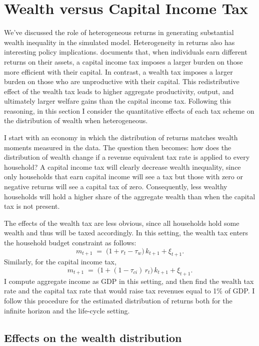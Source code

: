 \onlyinsubfile{\setcounter{section}{4}}
\section{Wealth versus Capital Income Tax}
\notinsubfile{\label{sec:Tax}}

\par We've discussed the role of heterogeneous returns in generating substantial wealth inequality in the simulated model. Heterogeneity in returns also has interesting policy implications.  \cite{Guvenen2023} documents that, when individuals earn different returns on their assets, a capital income tax imposes a larger burden on those more efficient with their capital. In contrast, a wealth tax imposes a larger burden on those who are unproductive with their capital. This redistributive effect of the wealth tax leads to higher aggregate productivity, output, and ultimately larger welfare gains than the capital income tax. Following this reasoning, in this section I consider the quantitative effects of each tax scheme on the distribution of wealth when heterogeneous.

\par I start with an economy in which the distribution of returns matches wealth moments measured in the data. The question then becomes: how does the distribution of wealth change if a revenue equivalent tax rate is applied to every household? A capital income tax will clearly decrease wealth inequality, since only households that earn capital income will see a tax but those with zero or negative returns will see a capital tax of zero. Consequently, less wealthy households will hold a higher share of the aggregate wealth than when the capital tax is not present.

The effects of the wealth tax are less obvious, since all households hold some wealth and thus will be taxed accordingly. In this setting, the wealth tax enters the household budget constraint as follows: 
\[
m_{t+1} \;=\; \big(1 + r_t - \tau_w\big)\,k_{t+1} + \xi_{t+1}.
\] Similarly, for the capital income tax,
\[
m_{t+1} \;=\; \big(1 + (1-\tau_{ci})\,r_t\big)\,k_{t+1} + \xi_{t+1}.
\] I compute aggregate income as GDP in this setting, and then find the wealth tax rate and the capital tax rate that would raise tax revenues equal to 1\% of GDP. I follow this procedure for the estimated distribution of returns both for the infinite horizon and the life-cycle setting.

\subsection{Effects on the wealth distribution}

